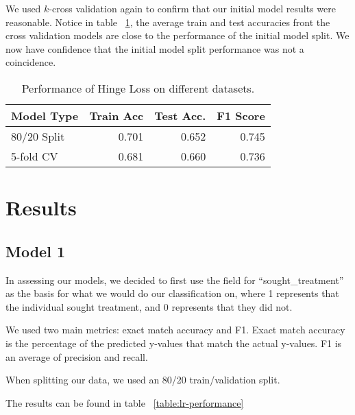 \documentclass[times, twocolumn]{article}
\begin{document}
We used $k$-cross validation again to confirm that our initial model results were
reasonable. Notice in table ~\ref{table:hinge-loss-cv-performance}, the average
train and test accuracies front the cross validation models are close to the
performance of the initial model split. We now have confidence that the initial
model split performance was not a coincidence.

\begin{table}
    \centering
    \begin{tabular}{lrrr}
        \hline \textbf{Model Type} & \textbf{Train Acc} & \textbf{Test Acc.} & \textbf{F1 Score} \\ \hline
        80/20 Split & 0.701 & 0.652 & 0.745\\
        5-fold CV & 0.681 & 0.660 & 0.736 \\
        \hline
    \end{tabular}
    \caption{Performance of Hinge Loss on different datasets.
    }
    \label{table:hinge-loss-cv-performance}
\end{table}

\section{Results}

\subsection{Model 1}

In assessing our models, we decided to first use the field for “sought\_treatment”
as the basis for what we would do our classification on, where 1 represents that
the individual sought treatment, and 0 represents that they did not.

We used two main metrics: exact match accuracy and F1. Exact match accuracy is
the percentage of the predicted y-values that match the actual y-values. F1 is
an average of precision and recall.

When splitting our data, we used an 80/20 train/validation split.

The results can be found in table ~\ref{table:lr-performance}
\end{document}
